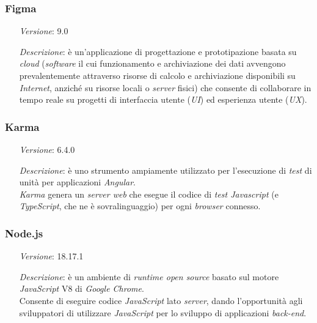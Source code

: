     \subsubsection*{Figma}
    \begin{itemize}[align=left]
        \item [\textit{Versione}:] 9.0
        \item [\textit{Descrizione}:] è un'applicazione di progettazione e prototipazione basata su \textit{cloud} (\textit{software} il cui funzionamento e archiviazione dei dati avvengono prevalentemente attraverso risorse di calcolo e archiviazione disponibili su \textit{Internet}, anziché su risorse locali o \textit{server} fisici)
                    che consente di collaborare in tempo reale su progetti di interfaccia utente (\textit{UI}) ed esperienza utente (\textit{UX}).
    \end{itemize}

    \subsubsection*{Karma}
    \begin{itemize}[align=left]
        \item [\textit{Versione}:] 6.4.0
        \item [\textit{Descrizione}:] è uno strumento ampiamente utilizzato per l'esecuzione di \textit{test} di unità per applicazioni \textit{Angular}. \\
                    \textit{Karma} genera un \textit{server web} che esegue il codice di \textit{test Javascript} (e \textit{TypeScript}, che ne è sovralinguaggio) per ogni \textit{browser} connesso.
    \end{itemize}

    \subsubsection*{Node.js}
    \begin{itemize}[align=left]
        \item [\textit{Versione}:] 18.17.1
        \item [\textit{Descrizione}:] è un ambiente di \textit{runtime open source} basato sul motore \textit{JavaScript} V8 di \textit{Google Chrome}. \\
                    Consente di eseguire codice \textit{JavaScript} lato \textit{server}, dando l'opportunità agli sviluppatori di utilizzare \textit{JavaScript} per lo sviluppo di applicazioni \textit{back-end}.
    \end{itemize}

